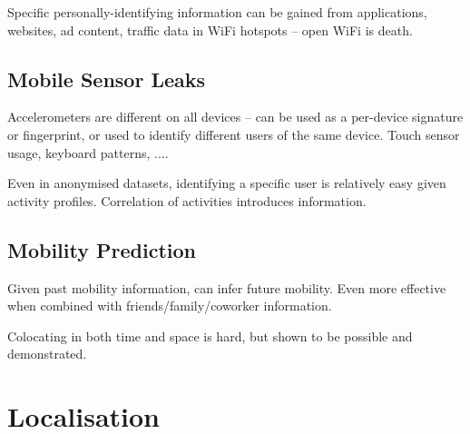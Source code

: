 \documentclass[a4paper, 11pt]{article}
\begin{document}
{{        Specific personally-identifying information can be gained from applications, websites, ad content, traffic data in WiFi hotspots -- open WiFi is death.
    }
    \subsection*{Mobile Sensor Leaks}
    {
        Accelerometers are different on all devices -- can be used as a per-device signature or fingerprint, or used to identify different users of the same device. Touch sensor usage, keyboard patterns, .... 
        
        Even in anonymised datasets, identifying a specific user is relatively easy given activity profiles. Correlation of activities introduces information.
    }
    \subsection*{Mobility Prediction}
    {
        Given past mobility information, can infer future mobility. Even more effective when combined with friends/family/coworker information.

        Colocating in both time and space is hard, but shown to be possible and demonstrated.
    }
}
\section*{Localisation}
{
    
}
\end{document}
